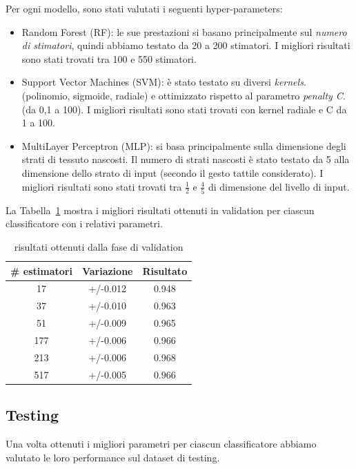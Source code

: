 Per ogni modello, sono stati valutati i seguenti hyper-parameters:

\begin{itemize}
	\item Random Forest (RF): le sue prestazioni si basano principalmente sul \textit{numero di stimatori}, quindi abbiamo testato da 20 a 200 stimatori. I migliori risultati sono stati trovati tra 100 e 550 stimatori.
	\item Support Vector Machines (SVM): è stato testato su diversi \textit{kernels}. (polinomio, sigmoide, radiale) e ottimizzato rispetto al parametro \textit{penalty C}. (da 0,1 a 100). I migliori risultati sono stati trovati con kernel radiale e C da 1 a 100.
	\item MultiLayer Perceptron (MLP): si basa principalmente sulla dimensione degli strati di tessuto nascosti. Il numero di strati nascosti è stato testato da 5 alla dimensione dello strato di input (secondo il gesto tattile considerato). I migliori risultati sono stati trovati tra $\frac{1}{2}$ e $\frac{4}{5}$ di dimensione del livello di input.
\end{itemize}


La Tabella~\ref{tab:validationresult} mostra i migliori risultati ottenuti in validation per ciascun classificatore con i relativi parametri.

\begin{table}[h]
\centering
\begin{tabular}{|c|c|c|}
\hline
\textbf{\# estimatori} & \textbf{Variazione} & \textbf{Risultato} \\ \hline
17 & +/-0.012 & 0.948 \\ \hline
37 & +/-0.010 & 0.963 \\ \hline
51 & +/-0.009 & 0.965 \\ \hline
177 & +/-0.006 & 0.966 \\ \hline
213 & +/-0.006 & 0.968 \\ \hline
517 & +/-0.005 & 0.966 \\ \hline
\end{tabular}
\caption{risultati ottenuti dalla fase di validation}
\label{tab:validationresult}
\end{table}
\FloatBarrier

\subsection{Testing}
\label{ssec:testing_Topic}
Una volta ottenuti i migliori parametri per ciascun classificatore abbiamo valutato le loro performance sul dataset di testing.

